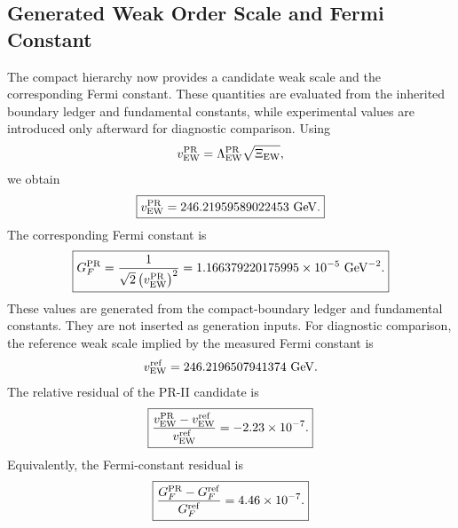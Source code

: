 \documentclass[11pt]{article}
\begin{document}
\subsection{Generated Weak Order Scale and Fermi Constant}
\label{sec:pr2_generated_weak_scale_fermi_constant}
 The compact hierarchy now provides a candidate weak scale and the corresponding Fermi constant. These quantities are evaluated from the inherited boundary ledger and fundamental constants, while experimental values are introduced only afterward for diagnostic comparison. Using
\begin{equation}
v_{\rm EW}^{\rm PR}
=
\Lambda_{\rm EW}^{\rm PR}
\sqrt{\Xi_{\rm EW}},
\end{equation}
we obtain
\begin{equation}
\boxed{
v_{\rm EW}^{\rm PR}
=
246.21959589022453\ {\rm GeV}.
}
\end{equation}
The corresponding Fermi constant is
\begin{equation}
\boxed{
G_F^{\rm PR}
=
\frac{1}{
\sqrt2
\left(
v_{\rm EW}^{\rm PR}
\right)^2
}
=
1.166379220175995\times10^{-5}\ {\rm GeV}^{-2}.
}
\end{equation}
These values are generated from the compact-boundary ledger and fundamental constants. 
They are not inserted as generation inputs. For diagnostic comparison, the reference weak scale implied by the measured Fermi constant is
\begin{equation}
v_{\rm EW}^{\rm ref}
=
246.2196507941374\ {\rm GeV}.
\end{equation}
The relative residual of the PR-II candidate is
\begin{equation}
\boxed{
\frac{
v_{\rm EW}^{\rm PR}
-
v_{\rm EW}^{\rm ref}
}{
v_{\rm EW}^{\rm ref}
}
=
-2.23\times10^{-7}.
}
\end{equation}
Equivalently, the Fermi-constant residual is
\begin{equation}
\boxed{
\frac{
G_F^{\rm PR}
-
G_F^{\rm ref}
}{
G_F^{\rm ref}
}
=
4.46\times10^{-7}.
}
\end{equation}
\end{document}
